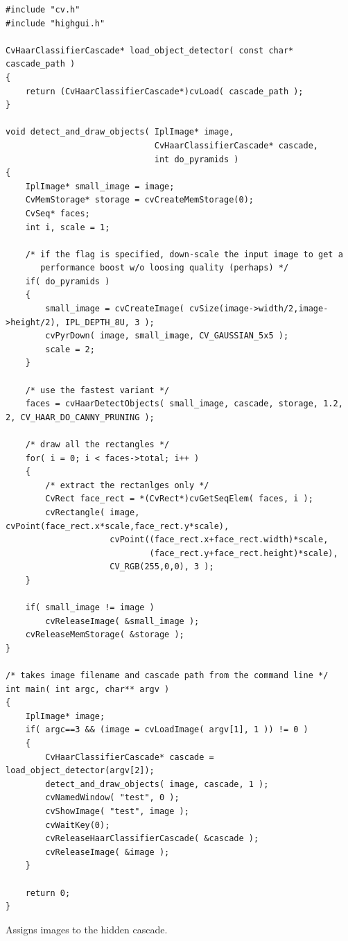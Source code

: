 \ifC
\begin{lstlisting}
#include "cv.h"
#include "highgui.h"

CvHaarClassifierCascade* load_object_detector( const char* cascade_path )
{
    return (CvHaarClassifierCascade*)cvLoad( cascade_path );
}

void detect_and_draw_objects( IplImage* image,
                              CvHaarClassifierCascade* cascade,
                              int do_pyramids )
{
    IplImage* small_image = image;
    CvMemStorage* storage = cvCreateMemStorage(0);
    CvSeq* faces;
    int i, scale = 1;

    /* if the flag is specified, down-scale the input image to get a
       performance boost w/o loosing quality (perhaps) */
    if( do_pyramids )
    {
        small_image = cvCreateImage( cvSize(image->width/2,image->height/2), IPL_DEPTH_8U, 3 );
        cvPyrDown( image, small_image, CV_GAUSSIAN_5x5 );
        scale = 2;
    }

    /* use the fastest variant */
    faces = cvHaarDetectObjects( small_image, cascade, storage, 1.2, 2, CV_HAAR_DO_CANNY_PRUNING );

    /* draw all the rectangles */
    for( i = 0; i < faces->total; i++ )
    {
        /* extract the rectanlges only */
        CvRect face_rect = *(CvRect*)cvGetSeqElem( faces, i );
        cvRectangle( image, cvPoint(face_rect.x*scale,face_rect.y*scale),
                     cvPoint((face_rect.x+face_rect.width)*scale,
                             (face_rect.y+face_rect.height)*scale),
                     CV_RGB(255,0,0), 3 );
    }

    if( small_image != image )
        cvReleaseImage( &small_image );
    cvReleaseMemStorage( &storage );
}

/* takes image filename and cascade path from the command line */
int main( int argc, char** argv )
{
    IplImage* image;
    if( argc==3 && (image = cvLoadImage( argv[1], 1 )) != 0 )
    {
        CvHaarClassifierCascade* cascade = load_object_detector(argv[2]);
        detect_and_draw_objects( image, cascade, 1 );
        cvNamedWindow( "test", 0 );
        cvShowImage( "test", image );
        cvWaitKey(0);
        cvReleaseHaarClassifierCascade( &cascade );
        cvReleaseImage( &image );
    }

    return 0;
}
\end{lstlisting}

Assigns images to the hidden cascade.

